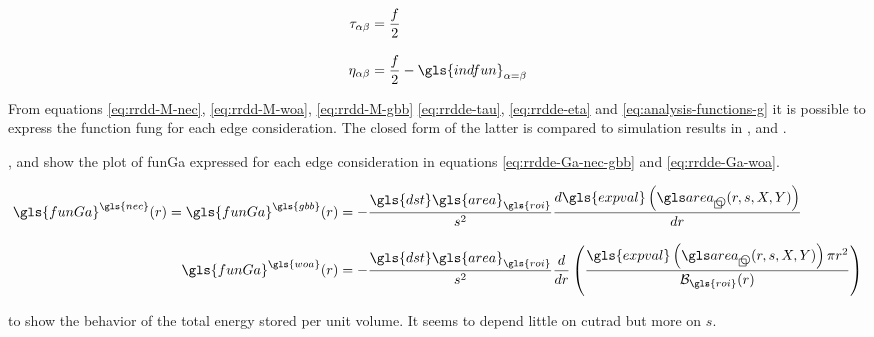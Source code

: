 \begin{align}
  \tau_{\alpha \beta} &=
    \frac{f}{2}
    \label{eq:rrdde-tau}
  \\[3mm]
  \eta_{\alpha \beta} &=
    \frac{f}{2} - \gls{indfun}_{\alpha = \beta}
    \label{eq:rrdde-eta}
\end{align}

\bigskip

From equations \eqref{eq:rrdd-M-nec}, \eqref{eq:rrdd-M-woa}, \eqref{eq:rrdd-M-gbb} \eqref{eq:rrdde-tau}, \eqref{eq:rrdde-eta} and \eqref{eq:analysis-functions-g} it is possible to express the function \gls{fung} for each edge consideration.
The closed form of the latter is compared to simulation results in ,  and .

%
%
%

\newpage

,  and  show the plot of \gls{funGa} expressed for each edge consideration in equations \eqref{eq:rrdde-Ga-nec-gbb} and \eqref{eq:rrdde-Ga-woa}.

\begin{align}
  \gls{funGa}^{\gls{nec}} (r) =
  \gls{funGa}^{\gls{gbb}} (r) &=
    - \frac{\gls{dst} \gls{area}_{\gls{roi}}}{s^2} \frac{d \gls{expval} \left( \cirsqr(r, s, X, Y) \right)}{dr}
    \label{eq:rrdde-Ga-nec-gbb}
  \\[3mm]
  \gls{funGa}^{\gls{woa}} (r) &=
    - \frac{\gls{dst} \gls{area}_{\gls{roi}}}{s^2} \frac{d}{dr} \left( \frac{\gls{expval} \left( \cirsqr(r, s, X, Y) \right) \pi r^2}{ \mathcal{B}_{\gls{roi}}(r)} \right)
    \label{eq:rrdde-Ga-woa}
\end{align}

%
%
%

\bigskip

 to  show the behavior of the total energy stored per unit volume. It seems to depend little on \gls{cutrad} but more on \( s \).

